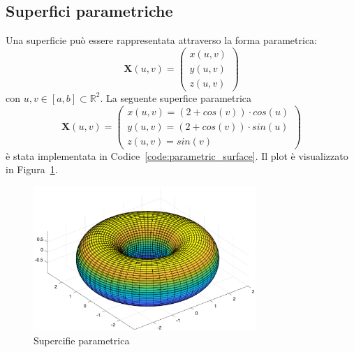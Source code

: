 \documentclass[a4paper, 12pt]{article}
\begin{document}
\subsection{Superfici parametriche}
Una superficie può essere rappresentata attraverso la forma parametrica:
$$\mathbf{X}(u, v) = \begin{pmatrix}
  x(u, v) \\
  y(u, v) \\
  z(u, v)
\end{pmatrix}$$
con $u, v \in [a, b] \subset \mathbb{R}^2$.
La seguente superfice parametrica 
$$\mathbf{X}(u, v) = \begin{pmatrix}
  x(u, v) = (2 + cos(v)) \cdot cos(u)\\
  y(u, v) = (2 + cos(v)) \cdot sin(u)\\
  z(u, v) = sin(v)
\end{pmatrix}$$
è stata implementata in Codice~\ref{code:parametric_surface}. Il plot è visualizzato in Figura~\ref{fig:parametric_surface}.

\begin{figure}[]
  \centering
  \includegraphics[width=0.75\textwidth]{figure/parametric_surface.eps}
  \caption{Supercifie parametrica}
  \label{fig:parametric_surface}
\end{figure} 
\end{document}
